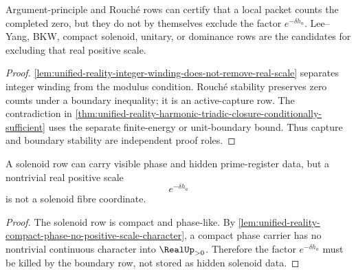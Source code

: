 \begin{corollary}
\label{cor:unified-reality-capture-boundary-distinct-jobs}
Argument-principle and Rouch\'e rows can certify that a local packet
counts the completed zero, but they do not by themselves exclude the
factor $e^{-\delta h_a}$.  Lee--Yang, BKW, compact solenoid, unitary, or
dominance rows are the candidates for excluding that real positive
scale.
\end{corollary}

\begin{proof}
\autoref{lem:unified-reality-integer-winding-does-not-remove-real-scale}
separates integer winding from the modulus condition.  Rouch\'e
stability preserves zero counts under a boundary inequality; it is an
active-capture row.  The contradiction in
\autoref{thm:unified-reality-harmonic-triadic-closure-conditionally-sufficient}
uses the separate finite-energy or unit-boundary bound.  Thus capture
and boundary stability are independent proof roles.
\end{proof}

\begin{corollary}
\label{cor:unified-reality-harmonic-solenoid-fibres-no-real-scale-row}
A solenoid row can carry visible phase and hidden prime-register data,
but a nontrivial real positive scale
$$
e^{-\delta h_a}
$$
is not a solenoid fibre coordinate.
\end{corollary}

\begin{proof}
The solenoid row is compact and phase-like.  By
\autoref{lem:unified-reality-compact-phase-no-positive-scale-character},
a compact phase carrier has no nontrivial continuous character into
$\RealUp_{>0}$.  Therefore the factor $e^{-\delta h_a}$ must be killed
by the boundary row, not stored as hidden solenoid data.
\end{proof}
